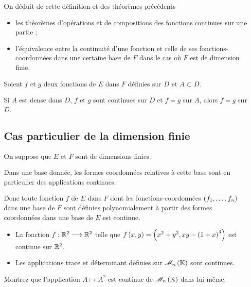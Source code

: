 On déduit de cette définition et des théorèmes précédents

\begin{itemize}
    \item les théorèmes d'opérations et de compositions des fonctions continues sur une partie ; \\
    \item l'équivalence entre la continuité d'une fonction et celle de ses fonctions-coordonnées dans une certaine base de \(F\) dans le cas où \(F\) est de dimension finie.
\end{itemize}

\begin{prop}
Soient \(f\) et \(g\) deux fonctions de \(E\) dans \(F\) définies sur \(D\) et \(A\subset D\).

Si \(A\) est dense dans \(D\), \(f\) et \(g\) sont continues sur \(D\) et \(f=g\) sur \(A\), alors \(f=g\) sur \(D\).
\end{prop}

\subsection{Cas particulier de la dimension finie}

On suppose que \(E\) et \(F\) sont de dimensions finies.

Dans une base donnée, les formes coordonnées relatives à cette base sont en particulier des applications continues.

Donc toute fonction \(f\) de \(E\) dans \(F\) dont les fonctions-coordonnées \(\left(f_1,\dots,f_n\right)\) dans une base de \(F\) sont définies polynomialement à partir des formes coordonnées dans une base de \(E\) est continue.

\begin{ex}
\begin{itemize}
    \item La fonction \(f:\mathbb{R}^2\longrightarrow\mathbb{R}^2\) telle que \(f\left(x,y\right)=\left(x^2+y^2,xy-\left(1+x\right)^3\right)\) est continue sur \(\mathbb{R}^2\). \\
    \item Les applications trace et déterminant définies sur \(\M{n}\) sont continues.
\end{itemize}
\end{ex}

\begin{exo}
Montrez que l'application \(A\mapsto A^2\) est continue de \(\M{n}\) dans lui-même.
\end{exo}

